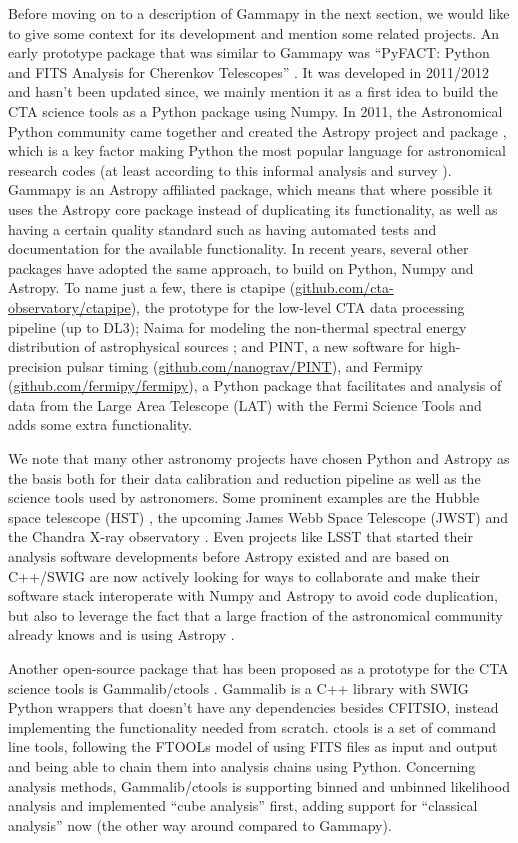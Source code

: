 \documentclass{PoS}
\newcommand{\urlCtaPipe}{\href{https://github.com/cta-observatory/ctapipe}{github.com/cta-observatory/ctapipe}}
\newcommand{\urlPint}{\href{https://github.com/nanograv/PINT}{github.com/nanograv/PINT}}
\newcommand{\urlFermipy}{\href{https://github.com/fermipy/fermipy}{github.com/fermipy/fermipy}}
\begin{document}
Before moving on to a description of Gammapy in the next section, we would like
to give some context for its development and mention some related projects. An
early prototype package that was similar to Gammapy was ``PyFACT: Python and
FITS Analysis for Cherenkov Telescopes'' \cite{pyfact}. It was developed in
2011/2012 and hasn't been updated since, we mainly mention it as a first  idea
to build the CTA science tools as a Python package using Numpy. In 2011, the
Astronomical Python community came together and created the Astropy project and
package \cite{astropy}, which is a key factor making Python the most popular
language for astronomical research codes (at least according to this informal
analysis \cite{perry} and survey \cite{momcheva2015}). Gammapy is an Astropy
affiliated package, which means that where possible it uses the Astropy core
package instead of duplicating its functionality, as well as having a certain
quality standard such as having automated tests and documentation for the
available functionality. In recent years, several other packages have adopted
the same approach, to build on Python, Numpy and Astropy. To name just a few,
there is ctapipe (\urlCtaPipe), the prototype for the low-level CTA data
processing pipeline (up to DL3); Naima for modeling the non-thermal spectral
energy distribution of astrophysical sources \cite{naima}; and PINT, a new
software for high-precision pulsar timing (\urlPint), and Fermipy (\urlFermipy),
a Python package that facilitates and analysis of data from the Large Area
Telescope (LAT) with the Fermi Science Tools and adds some extra functionality.

We note that many other astronomy projects have chosen Python and Astropy as the
basis both for their data calibration and reduction pipeline as well as the
science tools used by astronomers. Some prominent examples are the Hubble space
telescope (HST) \cite{hubble}, the upcoming James Webb Space Telescope (JWST)
\cite{jwst} and the Chandra X-ray observatory \cite{sherpa2001, chandra}. Even
projects like LSST that started their analysis software developments before
Astropy existed and are based on C++/SWIG are now actively looking for ways to
collaborate and make their software stack interoperate with Numpy and Astropy to
avoid code duplication, but also to leverage the fact that a large fraction of
the astronomical community already knows and is using Astropy \cite{lsst}.

Another open-source package that has been proposed as a prototype for the CTA
science tools is Gammalib/ctools \cite{ctools}. Gammalib is a C++ library with
SWIG Python wrappers that doesn't have any dependencies besides CFITSIO, instead
implementing the functionality needed from scratch. ctools is a set of command
line tools, following the FTOOLs model of using FITS files as input and output
and being able to chain them into analysis chains using Python. Concerning
analysis methods, Gammalib/ctools is supporting binned and unbinned likelihood
analysis and implemented ``cube analysis'' first, adding support for ``classical
analysis'' now (the other way around compared to Gammapy).
\end{document}
